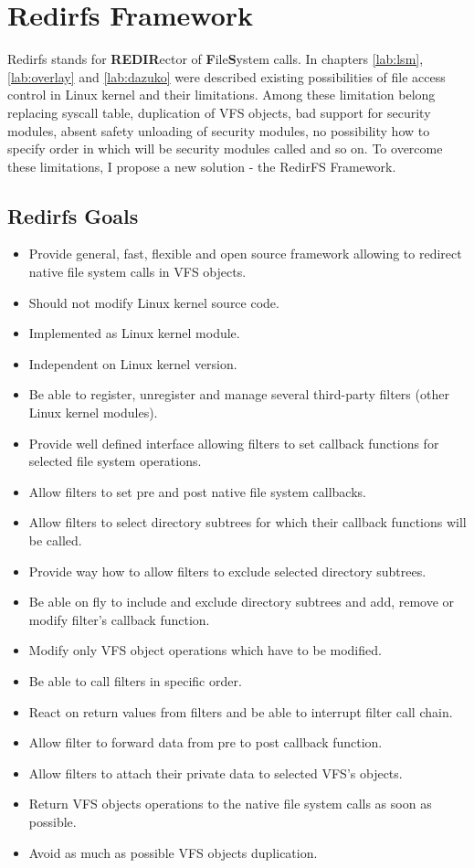 \chapter{Redirfs Framework}
Redirfs stands for \textbf{REDIR}ector of \textbf{F}ile\textbf{S}ystem calls. In
chapters \ref{lab:lsm}, \ref{lab:overlay} and \ref{lab:dazuko} were described existing
possibilities of file access control in Linux kernel and their limitations. Among
these limitation belong replacing syscall table, duplication of VFS objects, bad
support for security modules, absent safety unloading of security modules, no
possibility how to specify order in which will be security modules called and so on.
To overcome these limitations, I propose a new solution - the RedirFS Framework.

\section{Redirfs Goals}

\begin{itemize}
	\item Provide general, fast, flexible and open source framework allowing to
		redirect native file system calls in VFS objects.
	\item Should not modify Linux kernel source code. 
	\item Implemented as Linux kernel module.
	\item Independent on Linux kernel version.
	\item Be able to register, unregister and manage several third-party filters
		(other Linux kernel modules).
	\item Provide well defined interface allowing filters to set callback
		functions for selected file system operations.
	\item Allow filters to set pre and post native file system callbacks.
	\item Allow filters to select directory subtrees for which their callback
		functions will be called.
	\item Provide way how to allow filters to exclude selected directory
		subtrees.
	\item Be able on fly to include and exclude directory subtrees and add, remove
		or modify filter's callback function.
	\item Modify only VFS object operations which have to be modified.
	\item Be able to call filters in specific order.
	\item React on return values from filters and be able to interrupt filter call
		chain.
	\item Allow filter to forward data from pre to post callback function. 
	\item Allow filters to attach their private data to selected VFS's
		objects.
	\item Return VFS objects operations to the native file system calls as soon as
		possible.
	\item Avoid as much as possible VFS objects duplication.

\end{itemize}

